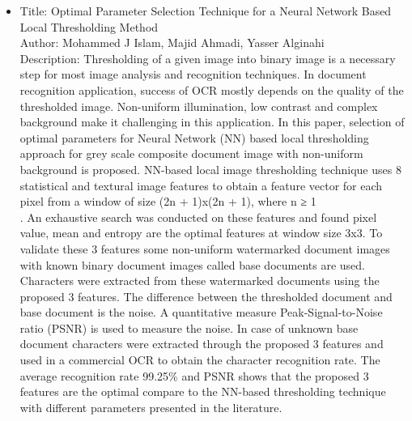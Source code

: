 \documentclass[oneside,a4paper,12pt]{report}
\begin{document}
\begin{itemize}
\item Title: Optimal Parameter Selection Technique for a Neural Network Based Local Thresholding Method\\
Author: Mohammed J Islam, Majid Ahmadi, Yasser Alginahi\\
Description: Thresholding of a given image into binary image is a necessary step for most image analysis and recognition techniques. In document recognition application, success of OCR mostly depends on the quality of the thresholded image. Non-uniform illumination, low contrast and complex background make it challenging in this application. In this paper, selection of optimal parameters for Neural Network (NN) based local thresholding approach for grey scale composite document image with non-uniform background is proposed. NN-based local image thresholding technique uses 8 statistical and textural image features to obtain a feature vector for each pixel from a window of size (2n + 1)x(2n + 1), where n ≥ 1\\.
An exhaustive search was conducted on these features and found pixel value, mean and entropy are the optimal features at window size 3x3. To validate these 3 features some non-uniform watermarked document images with known binary document images called base documents are used. Characters were extracted from these watermarked documents using the proposed 3 features. The difference between the thresholded document and base document is the noise. A quantitative measure Peak-Signal-to-Noise ratio (PSNR) is used to measure the noise. In case of unknown base document characters were extracted through the proposed 3 features and used in a commercial OCR to obtain the character recognition rate. The average recognition rate 99.25\% and PSNR shows that the proposed 3 features are the optimal compare to the NN-based thresholding technique with different
parameters presented in the literature. \\


\end{itemize}
\end{document}
